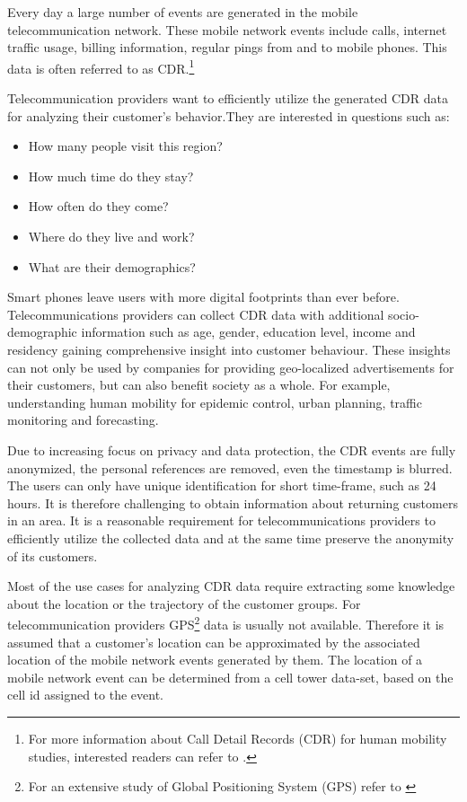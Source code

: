 Every day a large number of events are generated in the mobile telecommunication network. These mobile network events include calls, internet traffic usage, billing information, regular pings from and to mobile phones. This data is often referred to as CDR.\footnote{For more
information about Call Detail Records (CDR) for human mobility studies, interested readers can refer to \cite{spatiotemp}.} 

Telecommunication providers want to efficiently utilize the generated CDR data for analyzing their customer's behavior.They are interested in questions such as:
\begin{itemize}
\item How many people visit this region?
\item How much time do they stay?
\item How often do they come?
\item Where do they live and work?
\item What are their demographics?
\end{itemize}

Smart phones leave users with more digital footprints than ever before. Telecommunications providers can collect CDR data with additional socio-demographic information such as age, gender, education level, income and residency gaining comprehensive insight into customer behaviour. These insights can not only be used by companies for providing geo-localized advertisements for their customers, but can also benefit society as a whole. For example, understanding human mobility for epidemic control, urban planning, traffic monitoring and forecasting.

Due to increasing focus on privacy and data protection, the CDR events are fully anonymized, the personal references are removed, even the timestamp is blurred. The users can only have unique identification for short time-frame, such as 24 hours. It is therefore challenging to obtain information about returning customers in an area. It is a reasonable requirement for telecommunications providers to efficiently utilize the collected data and at the same time preserve the anonymity of its customers. 

Most of the use cases for analyzing CDR data require extracting some knowledge about the location or the trajectory of the customer groups. For telecommunication providers GPS\footnote{For an extensive study of Global Positioning System (GPS) refer to \cite{gps}} data is usually not available. Therefore it is assumed that a customer's location can be approximated by the associated location of the mobile network events generated by them. The location of a mobile network event can be determined from a cell tower data-set, based on the cell id assigned to the event.


